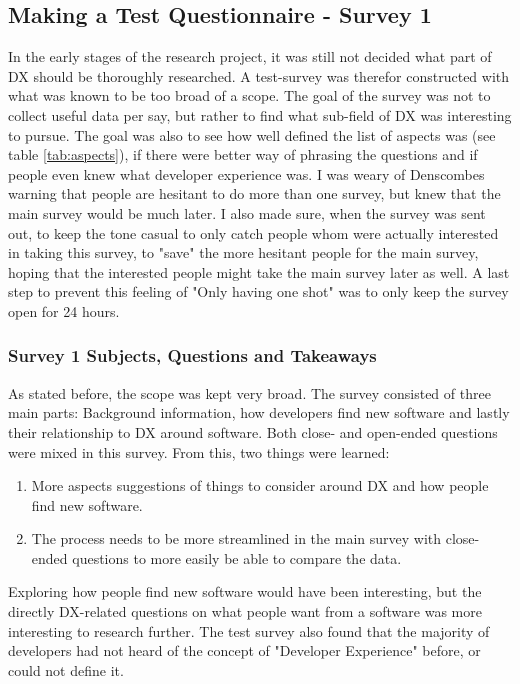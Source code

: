 \documentclass{cslthse-msc}
\begin{document}
    \subsection{Making a Test Questionnaire - Survey 1}
    In the early stages of the research project, it was still not decided what part of DX should be thoroughly researched.
    A test-survey was therefor constructed with what was known to be too broad of a scope. The goal of the survey was not to collect
    useful data per say, but rather to find what sub-field of DX was interesting to pursue. The goal was also to see how well defined the list of aspects was (see table \ref{tab:aspects}), if there were better way of phrasing the questions and if people even knew what developer experience was. I was weary of Denscombes warning that people are hesitant to do more than one survey, but knew that the main survey would be much later. I also made sure, when the survey was sent out, to keep the tone casual to only catch people whom were actually interested in taking this survey, to "save" the more hesitant people for the main survey, hoping that the interested people might take the main survey later as well. A last step to prevent this feeling of "Only having one shot" was to only keep the survey open for 24 hours.

    \subsubsection{Survey 1 Subjects, Questions and Takeaways}
    As stated before, the scope was kept very broad. The survey consisted of three main parts: Background information, how developers find new software and lastly their relationship to DX around software. Both close- and open-ended questions were mixed in this survey. From this, two things were learned:
    \begin{enumerate}
        \item More aspects suggestions of things to consider around DX and how people find new software.
        \item The process needs to be more streamlined in the main survey with close-ended questions to more easily be able to compare the data.
    \end{enumerate}

    Exploring how people find new software would have been interesting, but the directly DX-related questions on what people want from a software was more interesting to research further. The test survey also found that the majority of developers had not heard of the concept of "Developer Experience" before, or could not define it.
\end{document}
